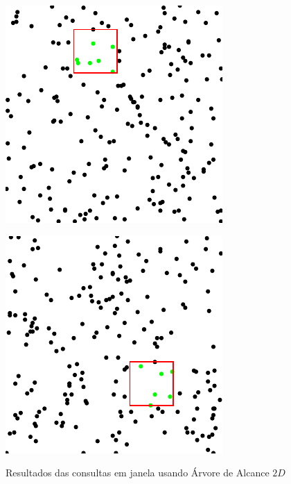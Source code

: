 \begin{figure}[h]
\centering
\begin{minipage}{.5\textwidth}
  \centering
  \includegraphics[width=.8\linewidth]{images/rt_t1.pdf}

  \label{fig:test1}
\end{minipage}%
\begin{minipage}{.5\textwidth}
  \centering
  
  \includegraphics[width=.8\linewidth]{images/rt_t2.pdf}
  \label{fig:test2}
 
\end{minipage}
 \caption{Resultados das consultas em janela usando Árvore de Alcance $2D$}
\end{figure}

